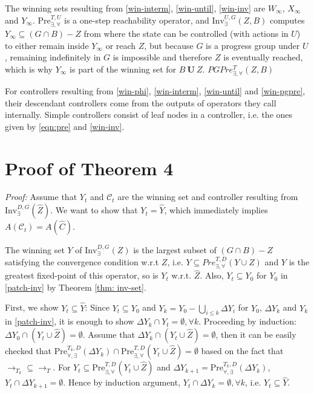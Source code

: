 The winning sets {\color{black} resulting from} \eqref{win-interm}, \eqref{win-until}, \eqref{win-inv} are $ W_{\infty} $, $ X_{\infty} $ and $ Y_{\infty} $. {\color{black} $\text{Pre}_{\exists,\forall}^{T,U}$ is a one-step reachability operator, and $\text{Inv}_{\exists}^{U,G}(Z,B)$ computes $Y_\infty \subseteq (G\cap B) - Z$ from where the state can be controlled (with actions in $U$) to either remain inside $Y_\infty$ or reach $Z$, but because $G$ is a progress group under $U$, remaining indefinitely in $G$ is impossible and therefore $Z$ is eventually reached, which is why $Y_\infty$ is {\color{teal}part of the} winning set for $B\mathbf{\ U\ }Z$.} {\color{teal} $ PGPre_{\exists,\forall}^T(Z,B) $ }
    
For controllers resulting from \eqref{win-phi}, \eqref{win-interm}, \eqref{win-until} and \eqref{win-pgpre}, their descendant controllers come from the outputs of operators they call internally. Simple controllers consist of leaf nodes in a controller, i.e. the ones given by \eqref{eqn:pre} and \eqref{win-inv}. 

\section{Proof of Theorem 4}\label{app:pr-31}


\emph{Proof:} Assume that $ Y_t $ and $ \mathcal{C}_t $ are the winning set and controller resulting from $ \text{Inv}_{\exists}^{D,G} (\widehat{Z}) $. We want to show that $ Y_t=\widehat{Y}$, which immediately implies $ A(\mathcal{C}_t) = A(\widehat{C}) $.
	
The winning set $ Y $ of $ \text{Inv}_{\exists}^{D,G} (Z) $ is the largest subset of $ (G\cap B) - Z  $ satisfying the convergence condition w.r.t $ Z $, i.e. $ Y \subseteq Pre^{T,D}_{\exists, \forall}(Y\cup Z) $ and $Y$ is the greatest fixed-point of this operator, so is $ Y_t $ w.r.t. $ \widehat{Z} $. Also, $ Y_t \subseteq Y_0 $ for $ Y_0 $ in \eqref{patch-inv} by Theorem \ref{thm: inv-set}. 
	
	First, we show $ Y_t \subseteq \widehat{Y} $: Since $ Y_t\subseteq Y_0 $ and $ Y_k = Y_0 - \bigcup_{i\leq k} \Delta Y_i$ for $ Y_0 $, $ \Delta Y_k $ and $ Y_k $ in \eqref{patch-inv}, it is enough to show $ \Delta Y_k\cap Y_t = \emptyset,\forall k $. Proceeding by induction: $ \Delta Y_0\cap (Y_t\cup \widehat{Z}) = \emptyset $. Assume that $ \Delta Y_k \cap (Y_t\cup \widehat{Z}) = \emptyset $, then it can be easily checked that $\text{Pre}_{\forall, \exists}^{T_k,D}(\Delta Y_k) \cap  \text{Pre}_{\exists,\forall}^{T,D} (Y_t\cup \widehat{Z}) = \emptyset$ based on the fact that	 $ \rightarrow_{T_k}\subseteq \rightarrow_{T} $. For $ Y_t \subseteq \text{Pre}_{\exists,\forall}^{T,D} (Y_t\cup \widehat{Z}) $ and $ \Delta Y_{k+1} = \text{Pre}_{\forall, \exists}^{T_k,D}(\Delta Y_k) $, $ Y_t\cap \Delta Y_{k+1} = \emptyset $. Hence by induction argument, $ Y_t \cap \Delta Y_k = \emptyset, \forall k $, i.e. $ Y_t\subseteq \widehat{Y} $. 
	
